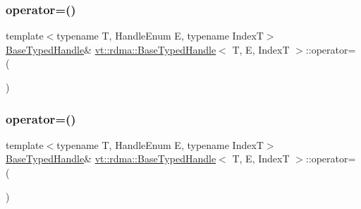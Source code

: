 \subsubsection{\texorpdfstring{operator=()}{operator=()}\hspace{0.1cm}{\footnotesize\ttfamily [1/2]}}
{\footnotesize\ttfamily template$<$typename T, Handle\+Enum E, typename IndexT$>$ \\
\hyperlink{structvt_1_1rdma_1_1_base_typed_handle}{Base\+Typed\+Handle}\& \hyperlink{structvt_1_1rdma_1_1_base_typed_handle}{vt\+::rdma\+::\+Base\+Typed\+Handle}$<$ T, E, IndexT $>$\+::operator= (\begin{DoxyParamCaption}\item[{\hyperlink{structvt_1_1rdma_1_1_base_typed_handle}{Base\+Typed\+Handle}$<$ T, E, IndexT $>$ const \&}]{ }\end{DoxyParamCaption})\hspace{0.3cm}{\ttfamily [default]}}

\mbox{\label{structvt_1_1rdma_1_1_base_typed_handle_a4f4dd9c546b56d3fc570500a79b048d8}} 
\subsubsection{\texorpdfstring{operator=()}{operator=()}\hspace{0.1cm}{\footnotesize\ttfamily [2/2]}}
{\footnotesize\ttfamily template$<$typename T, Handle\+Enum E, typename IndexT$>$ \\
\hyperlink{structvt_1_1rdma_1_1_base_typed_handle}{Base\+Typed\+Handle}\& \hyperlink{structvt_1_1rdma_1_1_base_typed_handle}{vt\+::rdma\+::\+Base\+Typed\+Handle}$<$ T, E, IndexT $>$\+::operator= (\begin{DoxyParamCaption}\item[{\hyperlink{structvt_1_1rdma_1_1_base_typed_handle}{Base\+Typed\+Handle}$<$ T, E, IndexT $>$ \&\&}]{ }\end{DoxyParamCaption})\hspace{0.3cm}{\ttfamily [default]}}

\mbox{\label{structvt_1_1rdma_1_1_base_typed_handle_a40156625b7effaa3ba9febceb829e9a0}} 
